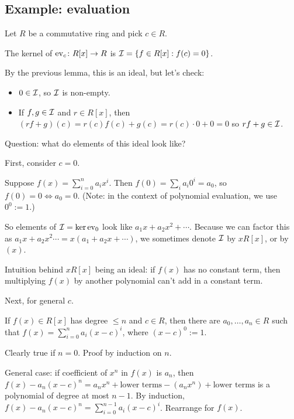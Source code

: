 \documentclass[12pt,letterpaper]{report}
\begin{document}
\pagebreak
\subsection{Example: evaluation}

Let $R$ be a commutative ring and pick $c \in R$.

The kernel of $\operatorname{ev}_c \colon R[x] \to R$ is $\mathcal{I} = \{f \in R[x] : f(c) = 0\}$.

By the previous lemma, this is an ideal, but let's check:
\begin{itemize}
  \item $0 \in \mathcal{I}$, so $\mathcal{I}$ is non-empty.
  \item If $f, g \in \mathcal{I}$ and $r \in R[x]$, then
    $(rf + g)(c) = r(c)f(c) + g(c) = r(c) \cdot 0 + 0 = 0$ so $rf + g \in \mathcal{I}$.
\end{itemize}

Question: what do elements of this ideal look like?

First, consider $c = 0$.

Suppose $f(x) = \sum_{i = 0}^n a_i x^i$.
Then $f(0) = \sum_i a_i 0^i = a_0$, so $f(0) = 0 \iff a_0 = 0$.
(Note: in the context of polynomial evaluation, we use $0^0 := 1$.)

So elements of $\mathcal{I} = \ker\operatorname{ev}_0$ look like $a_1 x + a_2 x^2 + \cdots$.
Because we can factor this as $a_1 x + a_2 x^2 \cdots = x(a_1 + a_2 x + \cdots)$, we sometimes
denote $\mathcal{I}$ by $xR[x]$, or by $(x)$.

Intuition behind $xR[x]$ being an ideal: if $f(x)$ has no constant term, then multiplying $f(x)$ by
another polynomial can't add in a constant term.

Next, for general $c$.

\begin{lem}{}{}
  If $f(x) \in R[x]$ has degree $\leq n$ and $c \in R$, then there are $a_0, \ldots, a_n \in R$ such
  that $f(x) = \sum_{i = 0}^n a_i (x - c)^i$, where $(x - c)^0 := 1$.
\end{lem}

\begin{thmproof}
  Clearly true if $n = 0$.
  Proof by induction on $n$.

  General case: if coefficient of $x^n$ in $f(x)$ is $a_n$, then
  $f(x) - a_n(x - c)^n = a_n x^n + \text{lower terms} - (a_n x^n) + \text{lower terms}$ is a
  polynomial of degree at most $n - 1$.
  By induction, $f(x) - a_n(x - c)^n = \sum_{i = 0}^{n - 1} a_i(x - c)^i$.
  Rearrange for $f(x)$.
\end{thmproof}
\end{document}
